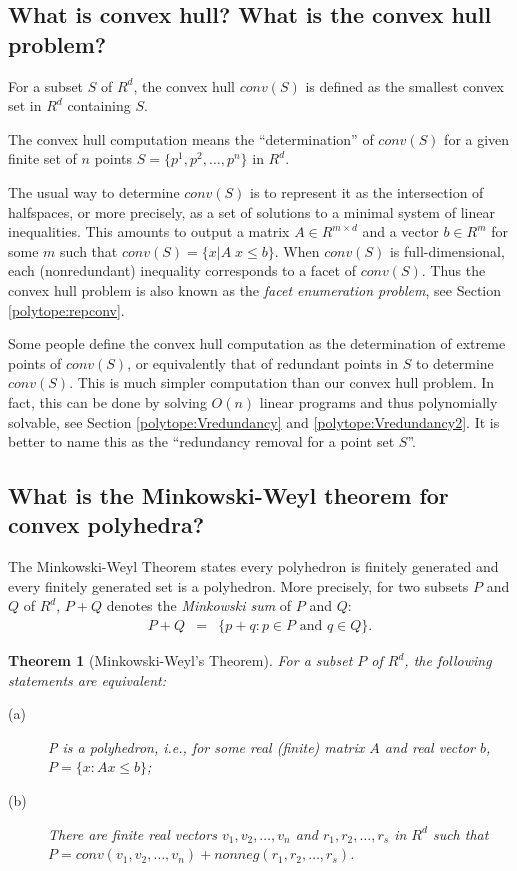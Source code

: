\documentclass[[a4paper,12pt]{article}
\newtheorem{theorem}{Theorem}
\begin{document}
\subsection{What is convex hull?  What is the convex hull problem?}
\label{polytope:convhullcomp}

For a subset $S$ of $R^d$, the convex hull $conv(S)$ is defined
as the smallest convex set in $R^d$ containing $S$.

The convex hull computation means the ``determination''
of $conv(S)$ for a given finite set of $n$ points 
$S =  \{p^1, p^2, \ldots, p^n\}$
in $R^d$.  

The usual way to determine $conv(S)$ is to
represent it as the intersection of halfspaces, or more precisely,
as a set of solutions to a minimal system of linear inequalities.
This amounts to output a matrix $A \in R^{m \times d}$ and
a vector $b\in R^m$ for some $m$ such that 
$conv(S) =\{ x | A \; x \le b \}$.
When $conv(S)$ is full-dimensional, 
each (nonredundant) inequality corresponds to
a facet of $conv(S)$.  Thus the convex hull problem is
also known as the {\em facet enumeration problem}, see 
Section \ref{polytope:repconv}.

Some people define the convex hull computation as the determination
of extreme points of $conv(S)$, or equivalently that of
redundant points in $S$ to determine $conv(S)$.  This is much simpler
computation than our convex hull problem.  In fact, this can be done
by solving $O(n)$ linear programs and thus polynomially solvable, 
see Section \ref{polytope:Vredundancy}
and \ref{polytope:Vredundancy2}.
It is better to name this as the ``redundancy removal for a point set $S$''.

\subsection{What is the Minkowski-Weyl theorem for convex polyhedra?
 } 
\label{polytope:MWtheorem}

The Minkowski-Weyl Theorem states every polyhedron is
finitely generated and every finitely generated set is a
polyhedron.  More precisely,
for two subsets $P$ and $Q$ of $R^d$, $P+Q$ denotes the
{\em Minkowski sum} of $P$ and $Q$:
\begin{eqnarray*}
    P + Q & = & 
    \{ p +q: p \in P \mbox{ and } q \in Q  \}.
\end{eqnarray*}

\begin{theorem} [Minkowski-Weyl's Theorem] \label{thm:Minkowski-Weyl1}
For a subset $P$ of $R^d$, the  following statements are equivalent:
\begin{description}
\item[(a)] P is a polyhedron, i.e., for some real (finite) matrix $A$ and real vector $b$,
$ P=\{ x :  A  x  \le  b \}$;

\item[(b)] There are finite real vectors $v_1, v_2, \ldots, v_n$ and 
$r_1, r_2, \ldots, r_s$ in $R^d$
such that\\
$P = conv(v_1, v_2, \ldots, v_n) + nonneg(r_1, r_2, \ldots, r_s)$. 
\end{description}
\end{theorem}
\end{document}

